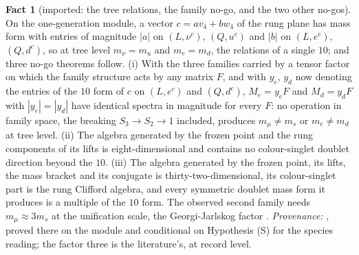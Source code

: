 \documentclass[11pt]{article}
\theoremstyle{definition}
\newtheorem{fact}[theorem]{Fact}
\begin{document}
\begin{fact}[imported: the tree relations, the family no-go, and the two other no-gos]\label{fact:nogos}
On the one-generation module, a vector $c = a v_{4} + b w_{4}$ of the rung plane has mass form with entries of magnitude $|a|$ on $(L, \nu^{c})$, $(Q, u^{c})$ and $|b|$ on $(L, e^{c})$, $(Q, d^{c})$, so at tree level $m_{\nu} = m_{u}$ and $m_{e} = m_{d}$, the relations of a single $10$; and three no-go theorems follow. (i) With the three families carried by a tensor factor on which the family structure acts by any matrix $F$, and with $y_{e}$, $y_{d}$ now denoting the entries of the $10$ form of $c$ on $(L, e^{c})$ and $(Q, d^{c})$, $M_{e} = y_{e}F$ and $M_{d} = y_{d}F$ with $|y_{e}| = |y_{d}|$ have identical spectra in magnitude for every $F$: no operation in family space, the breaking $S_{3} \to S_{2} \to 1$ included, produces $m_{\mu} \neq m_{s}$ or $m_{e} \neq m_{d}$ at tree level. (ii) The algebra generated by the frozen point and the rung components of its lifts is eight-dimensional and contains no colour-singlet doublet direction beyond the $10$. (iii) The algebra generated by the frozen point, its lifts, the mass bracket and its conjugate is thirty-two-dimensional, its colour-singlet part is the rung Clifford algebra, and every symmetric doublet mass form it produces is a multiple of the $10$ form. The observed second family needs $m_{\mu} \approx 3 m_{s}$ at the unification scale, the Georgi-Jarlskog factor \cite{GeorgiJarlskog1979}. \emph{Provenance:} \cite[Cor.~9.25, Thms.~9.31, 9.33, 9.35]{ButlerT12}, proved there on the module and conditional on Hypothesis (S) for the species reading; the factor three is the literature's, at record level.
\end{fact}
\end{document}
